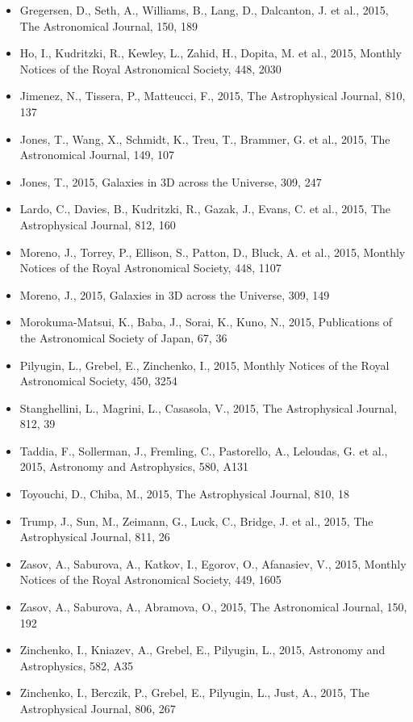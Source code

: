 \documentclass{letter}
\begin{document}
\begin{enumerate}
\begin{itemize}
\item Gregersen, D., Seth, A., Williams, B., Lang, D., Dalcanton, J. et al., 2015, The Astronomical Journal, 150, 189
\item Ho, I., Kudritzki, R., Kewley, L., Zahid, H., Dopita, M. et al., 2015, Monthly Notices of the Royal Astronomical Society, 448, 2030
\item Jimenez, N., Tissera, P., Matteucci, F., 2015, The Astrophysical Journal, 810, 137
\item Jones, T., Wang, X., Schmidt, K., Treu, T., Brammer, G. et al., 2015, The Astronomical Journal, 149, 107
\item Jones, T., 2015, Galaxies in 3D across the Universe, 309, 247
\item Lardo, C., Davies, B., Kudritzki, R., Gazak, J., Evans, C. et al., 2015, The Astrophysical Journal, 812, 160
\item Moreno, J., Torrey, P., Ellison, S., Patton, D., Bluck, A. et al., 2015, Monthly Notices of the Royal Astronomical Society, 448, 1107
\item Moreno, J., 2015, Galaxies in 3D across the Universe, 309, 149
\item Morokuma-Matsui, K., Baba, J., Sorai, K., Kuno, N., 2015, Publications of the Astronomical Society of Japan, 67, 36
\item Pilyugin, L., Grebel, E., Zinchenko, I., 2015, Monthly Notices of the Royal Astronomical Society, 450, 3254
\item Stanghellini, L., Magrini, L., Casasola, V., 2015, The Astrophysical Journal, 812, 39
\item Taddia, F., Sollerman, J., Fremling, C., Pastorello, A., Leloudas, G. et al., 2015, Astronomy and Astrophysics, 580, A131
\item Toyouchi, D., Chiba, M., 2015, The Astrophysical Journal, 810, 18
\item Trump, J., Sun, M., Zeimann, G., Luck, C., Bridge, J. et al., 2015, The Astrophysical Journal, 811, 26
\item Zasov, A., Saburova, A., Katkov, I., Egorov, O., Afanasiev, V., 2015, Monthly Notices of the Royal Astronomical Society, 449, 1605
\item Zasov, A., Saburova, A., Abramova, O., 2015, The Astronomical Journal, 150, 192
\item Zinchenko, I., Kniazev, A., Grebel, E., Pilyugin, L., 2015, Astronomy and Astrophysics, 582, A35
\item Zinchenko, I., Berczik, P., Grebel, E., Pilyugin, L., Just, A., 2015, The Astrophysical Journal, 806, 267

\end{itemize}
\end{enumerate}
\end{document}
